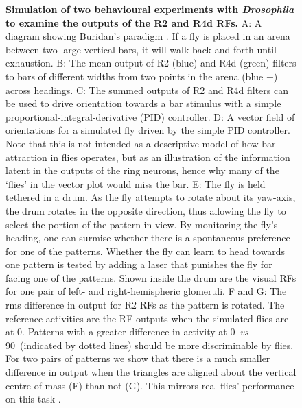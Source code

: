 \begin{figure}[htp]
	\caption{
		{\bf Simulation of two behavioural experiments with \emph{Drosophila} to examine the outputs of the R2 and R4d \acp{RF}.}
		A: A diagram showing Buridan's paradigm \protect\cite{Gotz1980,Bulthoff1982}. If a fly is placed in an arena between two large vertical bars, it will walk back and forth until exhaustion.
		B: The mean output of R2 (blue) and R4d (green) filters to bars of different widths from two points in the arena (blue +) across headings.
		C: The summed outputs of R2 and R4d filters can be used to drive orientation towards a bar stimulus with a simple
		proportional-integral-derivative (PID) controller.
		D: A vector field of orientations for a simulated fly driven by the simple PID controller.
		Note that this is not intended as a descriptive model of how bar attraction in flies operates, but as an illustration of the information latent in the outputs of the ring neurons, hence why many of the `flies' in the vector plot would miss the bar.
		E: The fly is held tethered in a drum. As the fly attempts to rotate about its yaw-axis, the drum rotates in the opposite direction, thus allowing the fly to select the portion of the pattern in view.
		By monitoring the fly's heading, one can surmise whether there is a spontaneous preference for one of the patterns.
		Whether the fly can learn to head towards one pattern is tested by adding a laser that punishes the fly for facing one of the patterns.
		Shown inside the drum are the visual \acp{RF} for one pair of left- and right-hemispheric glomeruli.
		F and G: The \ac{rms} difference in output for R2 \acp{RF} as the pattern is rotated.
		The reference activities are the \ac{RF} outputs when the simulated flies are at 0\degree.
		Patterns with a greater difference in activity at 0\degree\ \emph{vs} 90\degree\ (indicated by dotted lines) should be more discriminable by flies.
		For two pairs of patterns we show that there is a much smaller difference in output when the triangles are aligned about the vertical centre of mass (F) than not (G).
		This mirrors real flies' performance on this task \cite{Ernst1999}.
	}
	\label{fig:recap}
\end{figure}

